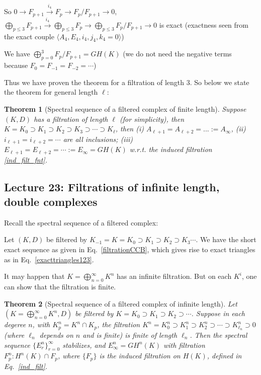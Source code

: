 \documentclass{article}
\theoremstyle{mystyle}
\newtheorem*{theorem*}{Theorem}
\theoremstyle{remark}
\numberwithin{equation}{section}
\begin{document}
So $0\rightarrow F_{p+1}\xrightarrow{i_4}F_p\rightarrow F_p/F_{p+1}\rightarrow 0$, $\bigoplus_{p\leq 3} F_{p+1}\xrightarrow{i_4}
\bigoplus_{p\leq 3} F_p \rightarrow
\bigoplus_{p\leq 3} F_p/F_{p+1}\rightarrow 0$ is exact (exactness seen from the exact couple $\langle A_4,E_4,i_4,j_4,k_4=0\rangle$)

We have $\bigoplus_{p=0}^3 F_p/F_{p+1} = GH(K)$ (we do not need the negative terms because $F_0=F_{-1}=F_{-2}=\cdots$)

Thus we have proven the theorem for a filtration of length 3. So below we state the theorem for general length $\ell$:

\begin{theorem*}[Spectral sequence of a filtered complex of finite length] Suppose $(K,D)$ has a filtration of length $\ell$ (for simplicity), then
$K = K_0\supset K_1 \supset K_2 \supset K_3 \supset \cdots \supset K_\ell$, then (i) $A_{\ell+1}=A_{\ell+2} = ... := A_\infty$, (ii) $i_{\ell+1} = i_{\ell+2} =  \cdots$ are all inclusions; (iii) $E_{\ell+1}=E_{\ell+2}=\cdots :=E_\infty = GH(K)$ w.r.t. the induced filtration \eqref{ind_filt_fnt}.
\end{theorem*}

\subsection{Lecture 23: Filtrations of infinite length, double complexes}

Recall the spectral sequence of a filtered complex:

Let $(K,D)$ be filtered by $K_{-1}=K=K_0\supset K_1\supset K_2\supset K_3\cdots$. We have the short exact sequence as given in Eq.~\eqref{filtrationCCB}, which gives rise to exact triangles as in Eq.~\eqref{exacttriangles123}.



It may happen that $K = \bigoplus_{n=0}^\infty K^n$ has an infinite filtration. But on each $K^i$, one can show that the filtration is finite.

\begin{theorem*}[Spectral sequence of a filtered complex of infinite length] Let $(K = \bigoplus_{n=0}^\infty K^n,D)$ be filtered by $K=K_0\supset K_1\supset K_2\supset \cdots$. Suppose in each degeree $n$, with $K^n_p= K^n\cap K_p$, the filtration
$K^n=K^n_0 \supset K^n_1 \supset K^n_2 \supset \cdots\supset K^n_{\ell_n}\supset 0$ (where $\ell_n$ depends on $n$ and is finite) is finite of length $\ell_n$. Then the spectral sequence $\{E^n_r\}_{r=0}^\infty$ stabilizes, and $E^n_\infty = GH^n(K)$ with filtration $F^n_p\colon H^n(K)\cap F_p$, where $\{F_p\}$ is the induced filtration on $H(K)$, defined in Eq.~\eqref{ind_filt}. 
\end{theorem*}
\end{document}
